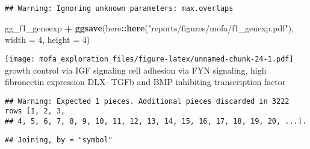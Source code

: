 \documentclass[
]{article}
\newenvironment{Shaded}{\begin{snugshade}}{\end{snugshade}}
\newcommand{\DataTypeTok}[1]{\textcolor[rgb]{0.13,0.29,0.53}{#1}}
\newcommand{\DecValTok}[1]{\textcolor[rgb]{0.00,0.00,0.81}{#1}}
\newcommand{\KeywordTok}[1]{\textcolor[rgb]{0.13,0.29,0.53}{\textbf{#1}}}
\newcommand{\NormalTok}[1]{#1}
\newcommand{\OperatorTok}[1]{\textcolor[rgb]{0.81,0.36,0.00}{\textbf{#1}}}
\newcommand{\StringTok}[1]{\textcolor[rgb]{0.31,0.60,0.02}{#1}}
\begin{document}
\begin{verbatim}
## Warning: Ignoring unknown parameters: max.overlaps
\end{verbatim}

\begin{Shaded}
\begin{Highlighting}[]
\NormalTok{gg_f1_geneexp }\OperatorTok{+}\StringTok{ }
\StringTok{  }\KeywordTok{ggsave}\NormalTok{(here}\OperatorTok{::}\KeywordTok{here}\NormalTok{(}\StringTok{"reports/figures/mofa/f1_genexp.pdf"}\NormalTok{), }\DataTypeTok{width =} \DecValTok{4}\NormalTok{, }\DataTypeTok{height =} \DecValTok{4}\NormalTok{)}
\end{Highlighting}
\end{Shaded}

\texttt{[image: mofa\_exploration\_files/figure-latex/unnamed-chunk-24-1.pdf]}
growth control via IGF signaling cell adhesion via FYN signaling, high
fibronectin expression DLX- TGFb and BMP inhibiting transcription factor

\begin{Shaded}
\end{Shaded}

\begin{verbatim}
## Warning: Expected 1 pieces. Additional pieces discarded in 3222 rows [1, 2, 3,
## 4, 5, 6, 7, 8, 9, 10, 11, 12, 13, 14, 15, 16, 17, 18, 19, 20, ...].
\end{verbatim}

\begin{verbatim}
## Joining, by = "symbol"
\end{verbatim}
\end{document}
